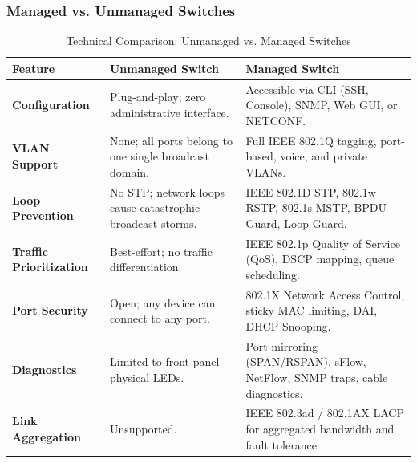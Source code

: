 \subsubsection{Managed vs. Unmanaged Switches}
\begin{table}[H]
\centering
\small
{}
\begin{tabularx}{\linewidth}{l X X}
\toprule
\rowcolor{tableheadercolor}
\textbf{Feature} & \textbf{Unmanaged Switch} & \textbf{Managed Switch} \\
\midrule
\textbf{Configuration} & Plug-and-play; zero administrative interface. & Accessible via CLI (SSH, Console), SNMP, Web GUI, or NETCONF. \\
\textbf{VLAN Support} & None; all ports belong to one single broadcast domain. & Full IEEE 802.1Q tagging, port-based, voice, and private VLANs. \\
\textbf{Loop Prevention} & No STP; network loops cause catastrophic broadcast storms. & IEEE 802.1D STP, 802.1w RSTP, 802.1s MSTP, BPDU Guard, Loop Guard. \\
\textbf{Traffic Prioritization} & Best-effort; no traffic differentiation. & IEEE 802.1p Quality of Service (QoS), DSCP mapping, queue scheduling. \\
\textbf{Port Security} & Open; any device can connect to any port. & 802.1X Network Access Control, sticky MAC limiting, DAI, DHCP Snooping. \\
\textbf{Diagnostics} & Limited to front panel physical LEDs. & Port mirroring (SPAN/RSPAN), sFlow, NetFlow, SNMP traps, cable diagnostics. \\
\textbf{Link Aggregation} & Unsupported. & IEEE 802.3ad / 802.1AX LACP for aggregated bandwidth and fault tolerance. \\
\bottomrule
\end{tabularx}
\caption{Technical Comparison: Unmanaged vs. Managed Switches}
\end{table}

